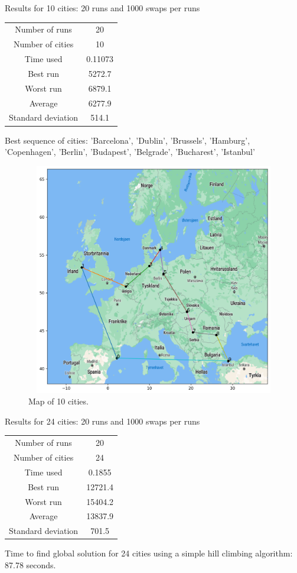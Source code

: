 \documentclass[a4paper,12pt]{article}
\begin{document}
Results for 10 cities: 20 runs and 1000 swaps per runs
\begin{center}
\begin{tabular}{c c}
 Number of runs & 20  \\ 
 Number of cities & 10  \\  
 Time used & 0.11073   \\  
 Best run & 5272.7   \\ 
Worst run & 6879.1   \\ 
Average & 6277.9   \\ 
 Standard deviation & 514.1   \\ 
\end{tabular}
\end{center}
Best sequence of cities: 'Barcelona', 'Dublin', 'Brussels', 'Hamburg', 'Copenhagen', 'Berlin', 'Budapest', 'Belgrade', 'Bucharest', 'Istanbul' \\ 
\begin{figure}[H]
\centerline{\includegraphics[width=6in, height=4in]{Hillclimber2.png}}
\caption{Map of 10 cities.}
\label{fig}
\end{figure}

Results for 24 cities: 20 runs and 1000 swaps per runs
\begin{center}
\begin{tabular}{ c c}
 Number of runs & 20  \\ 
 Number of cities & 24  \\  
 Time used & 0.1855   \\  
 Best run & 12721.4   \\ 
Worst run & 15404.2  \\ 
Average & 13837.9   \\ 
 Standard deviation & 701.5   \\ 
\end{tabular}
\end{center}
Time to find global solution for 24 cities using a simple hill climbing algorithm:  87.78  seconds.\\
\end{document}

